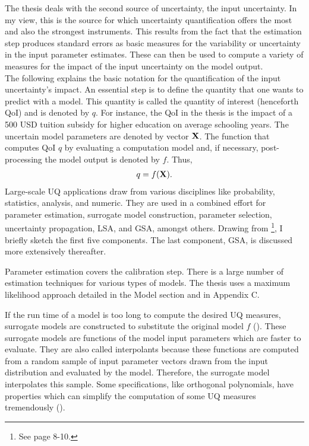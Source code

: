 \documentclass[a4paper,12pt]{article}
\begin{document}
The thesis deals with the second source of uncertainty, the input uncertainty. In my view, this is the source for which uncertainty quantification offers the most and also the strongest instruments. This results from the fact that the estimation step produces standard errors as basic measures for the variability or uncertainty in the input parameter estimates. These can then be used to compute a variety of measures for the impact of the input uncertainty on the model output.\\
\newline
The following explains the basic notation for the quantification of the input uncertainty's impact. An essential step is to define the quantity that one wants to predict with a model. This quantity is called the quantity of interest (henceforth QoI) and is denoted by $q$. For instance, the QoI in the thesis is the impact of a 500 USD tuition subsidy for higher education on average schooling years. The uncertain model parameters are denoted by vector $\bold{X}$. The function that computes QoI $q$ by evaluating a computation model and, if necessary, post-processing the model output is denoted by $f$. Thus,
\begin{align}
q = f(\bold{X}).
\end{align}
Large-scale UQ applications draw from various disciplines like probability, statistics, analysis, and numeric. They are used in a combined effort for parameter estimation, surrogate model construction, parameter selection, uncertainty propagation, LSA, and GSA, amongst others. Drawing from \cite{Smith.2014}\footnote{See page 8-10.}, I briefly sketch the first five components. The last component, GSA, is discussed more extensively thereafter.

Parameter estimation covers the calibration step. There is a large number of estimation techniques for various types of models. The thesis uses a maximum likelihood approach detailed in the Model section and in Appendix C.


If the run time of a model is too long to compute the desired UQ measures, surrogate models are constructed to substitute the original model $f$ (\cite{mcbride2019overview}). These surrogate models are functions of the model input parameters which are faster to evaluate. They are also called interpolants because these functions are computed from a random sample of input parameter vectors drawn from the input distribution and evaluated by the model. Therefore, the surrogate model interpolates this sample. Some specifications, like orthogonal polynomials, have properties which can simplify the computation of some UQ measures tremendously (\cite{xiu2010numerical}).
\end{document}
